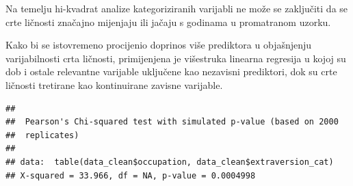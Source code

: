 \documentclass[
]{article}
\newenvironment{Shaded}{\begin{snugshade}}{\end{snugshade}}
\newcommand{\AttributeTok}[1]{\textcolor[rgb]{0.13,0.29,0.53}{#1}}
\newcommand{\ConstantTok}[1]{\textcolor[rgb]{0.56,0.35,0.01}{#1}}
\newcommand{\DecValTok}[1]{\textcolor[rgb]{0.00,0.00,0.81}{#1}}
\newcommand{\FunctionTok}[1]{\textcolor[rgb]{0.13,0.29,0.53}{\textbf{#1}}}
\newcommand{\NormalTok}[1]{#1}
\newcommand{\OtherTok}[1]{\textcolor[rgb]{0.56,0.35,0.01}{#1}}
\newcommand{\SpecialCharTok}[1]{\textcolor[rgb]{0.81,0.36,0.00}{\textbf{#1}}}
\newcommand{\StringTok}[1]{\textcolor[rgb]{0.31,0.60,0.02}{#1}}
\begin{document}
Na temelju hi-kvadrat analize kategoriziranih varijabli ne može se
zaključiti da se crte ličnosti značajno mijenjaju ili jačaju s godinama
u promatranom uzorku.

Kako bi se istovremeno procijenio doprinos više prediktora u objašnjenju
varijabilnosti crta ličnosti, primijenjena je višestruka linearna
regresija u kojoj su dob i ostale relevantne varijable uključene kao
nezavisni prediktori, dok su crte ličnosti tretirane kao kontinuirane
zavisne varijable.

\begin{Shaded}
\end{Shaded}

\begin{Shaded}
\end{Shaded}

\begin{Shaded}
\end{Shaded}

\begin{verbatim}
## 
##  Pearson's Chi-squared test with simulated p-value (based on 2000
##  replicates)
## 
## data:  table(data_clean$occupation, data_clean$extraversion_cat)
## X-squared = 33.966, df = NA, p-value = 0.0004998
\end{verbatim}

\begin{Shaded}
\end{Shaded}
\end{document}
